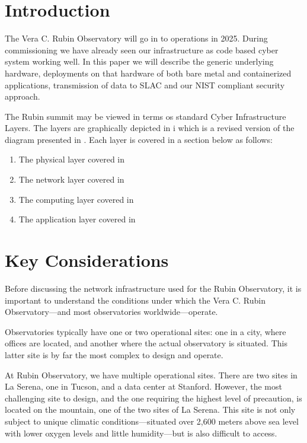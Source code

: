 \section{Introduction}

The Vera C. Rubin Observatory\cite{2019ApJ...873..111I} will go in to operations in 2025.
During commissioning we have already seen our infrastructure as code based cyber system working well.
In this paper we will describe the generic underlying hardware, deployments on that hardware of both bare metal and containerized applications, transmission of data to SLAC and our NIST\cite{NIST.SP.800-171} compliant security approach.

The Rubin summit may be viewed in terms os standard Cyber Infrastructure Layers.
The layers are graphically depicted in i which is a revised version of the diagram presented in \cite{2019arXiv190713060O}.
Each layer is covered in a section below as follows:

\begin{enumerate}
\item The physical layer covered in 
\item The network layer covered in 
\item The computing layer covered in 
\item The application layer covered in 
\end{enumerate}

\section{Key Considerations}
Before discussing the network infrastructure used for the Rubin Observatory, it is important to understand the conditions under which the Vera C. Rubin Observatory—and most observatories worldwide—operate. 

Observatories typically have one or two operational sites: one in a city, where offices are located, and another where the actual observatory is situated. This latter site is by far the most complex to design and operate.

At Rubin Observatory, we have multiple operational sites. There are two sites in La Serena, one in Tucson, and a data center at Stanford. However, the most challenging site to design, and the one requiring the highest level of precaution, is located on the mountain, one of the two sites of La Serena. This site is not only subject to unique climatic conditions—situated over 2,600 meters above sea level with lower oxygen levels and little humidity—but is also difficult to access.


